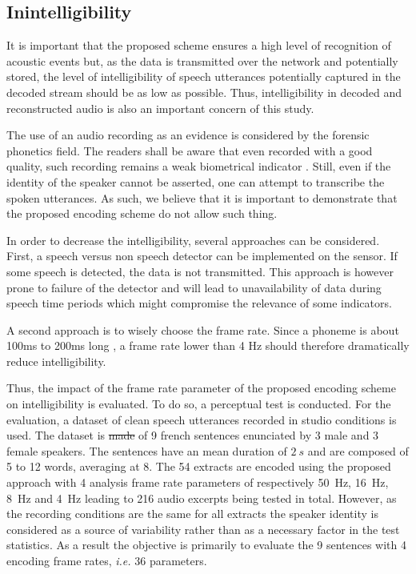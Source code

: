 \documentclass[sensors,article,submit,moreauthors,pdftex,10pt,a4paper]{mdpi}
\providecommand{\DIFaddtex}[1]{{\protect\color{blue}\uwave{#1}}} %
\providecommand{\DIFdeltex}[1]{{\protect\color{red}\sout{#1}}}                      %
\providecommand{\DIFaddbegin}{} %
\providecommand{\DIFaddend}{} %
\providecommand{\DIFdelbegin}{} %
\providecommand{\DIFdelend}{} %
\providecommand{\DIFadd}[1]{\texorpdfstring{\DIFaddtex{#1}}{#1}} %
\providecommand{\DIFdel}[1]{\texorpdfstring{\DIFdeltex{#1}}{}} %
\begin{document}
\DIFaddend \subsection{Inintelligibility} \DIFdelbegin %
\DIFdelend \DIFaddbegin \label{sec:inintelligibility_p}
\DIFaddend 

It is important that the proposed scheme ensures a high level of recognition of acoustic events but, as the data is transmitted over the network and potentially stored, the level of intelligibility of  speech utterances potentially captured in the decoded stream should be as low as possible. Thus, intelligibility in decoded and reconstructed audio is also an important concern of this study.

The use of an audio recording as an evidence is considered by the forensic phonetics \cite{baldwin1990forensic} field. The readers shall be aware that even recorded with a good quality, such recording remains a weak biometrical indicator \cite{boe2000forensic}. Still, even if the identity of the speaker cannot be asserted, one can attempt to transcribe the spoken utterances. As such, we believe that it is important to demonstrate that the proposed encoding scheme do not allow such thing.

In order to decrease the intelligibility, several approaches can be considered. First, a speech versus non speech detector can be implemented on the sensor. If some speech is detected, the data is not transmitted. This approach is however prone to failure of the detector and will lead to unavailability of data during speech time periods which might compromise the relevance of some indicators.

A second approach is to wisely choose the frame rate. Since a phoneme is about 100ms to 200ms long \cite{kuwabara1996acoustic} \cite{rosen1992temporal}, a frame rate lower than 4 Hz should therefore dramatically reduce intelligibility.

Thus, the impact of the frame rate parameter of the proposed encoding scheme on intelligibility is evaluated. To do so, a perceptual test is conducted. For the evaluation, a dataset of clean speech utterances recorded in studio conditions is used. The dataset is \DIFdelbegin \DIFdel{made }\DIFdelend \DIFaddbegin \DIFadd{composed }\DIFaddend of 9 french sentences enunciated by 3 male and 3 female speakers. The sentences have an mean duration of $2~s$ and are composed of 5 to 12 words, averaging at 8. The 54 extracts are encoded using the proposed approach with 4 analysis frame rate parameters of respectively 50~Hz, 16~Hz, 8~Hz and 4~Hz leading to 216 audio excerpts being tested in total. However, as the recording conditions are the same for all extracts the speaker identity is considered as a source of variability rather than as a necessary factor in the test statistics. As a result the objective is primarily to evaluate the 9 sentences with 4 encoding frame rates, \textit{i.e.} 36 parameters.
\end{document}
